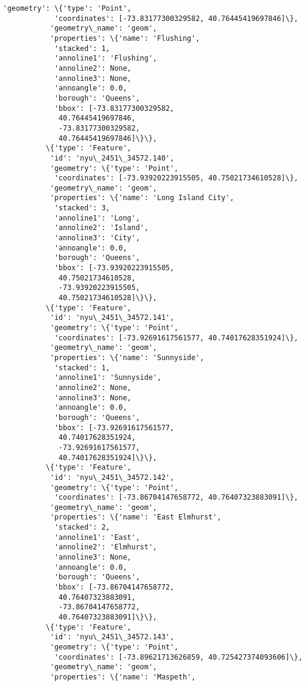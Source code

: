 \documentclass[11pt]{article}
\begin{document}
\begin{Verbatim}[commandchars=\\\{\}]
           'geometry': \{'type': 'Point',
            'coordinates': [-73.83177300329582, 40.76445419697846]\},
           'geometry\_name': 'geom',
           'properties': \{'name': 'Flushing',
            'stacked': 1,
            'annoline1': 'Flushing',
            'annoline2': None,
            'annoline3': None,
            'annoangle': 0.0,
            'borough': 'Queens',
            'bbox': [-73.83177300329582,
             40.76445419697846,
             -73.83177300329582,
             40.76445419697846]\}\},
          \{'type': 'Feature',
           'id': 'nyu\_2451\_34572.140',
           'geometry': \{'type': 'Point',
            'coordinates': [-73.93920223915505, 40.75021734610528]\},
           'geometry\_name': 'geom',
           'properties': \{'name': 'Long Island City',
            'stacked': 3,
            'annoline1': 'Long',
            'annoline2': 'Island',
            'annoline3': 'City',
            'annoangle': 0.0,
            'borough': 'Queens',
            'bbox': [-73.93920223915505,
             40.75021734610528,
             -73.93920223915505,
             40.75021734610528]\}\},
          \{'type': 'Feature',
           'id': 'nyu\_2451\_34572.141',
           'geometry': \{'type': 'Point',
            'coordinates': [-73.92691617561577, 40.74017628351924]\},
           'geometry\_name': 'geom',
           'properties': \{'name': 'Sunnyside',
            'stacked': 1,
            'annoline1': 'Sunnyside',
            'annoline2': None,
            'annoline3': None,
            'annoangle': 0.0,
            'borough': 'Queens',
            'bbox': [-73.92691617561577,
             40.74017628351924,
             -73.92691617561577,
             40.74017628351924]\}\},
          \{'type': 'Feature',
           'id': 'nyu\_2451\_34572.142',
           'geometry': \{'type': 'Point',
            'coordinates': [-73.86704147658772, 40.76407323883091]\},
           'geometry\_name': 'geom',
           'properties': \{'name': 'East Elmhurst',
            'stacked': 2,
            'annoline1': 'East',
            'annoline2': 'Elmhurst',
            'annoline3': None,
            'annoangle': 0.0,
            'borough': 'Queens',
            'bbox': [-73.86704147658772,
             40.76407323883091,
             -73.86704147658772,
             40.76407323883091]\}\},
          \{'type': 'Feature',
           'id': 'nyu\_2451\_34572.143',
           'geometry': \{'type': 'Point',
            'coordinates': [-73.89621713626859, 40.725427374093606]\},
           'geometry\_name': 'geom',
           'properties': \{'name': 'Maspeth',

\end{Verbatim}
\end{document}
